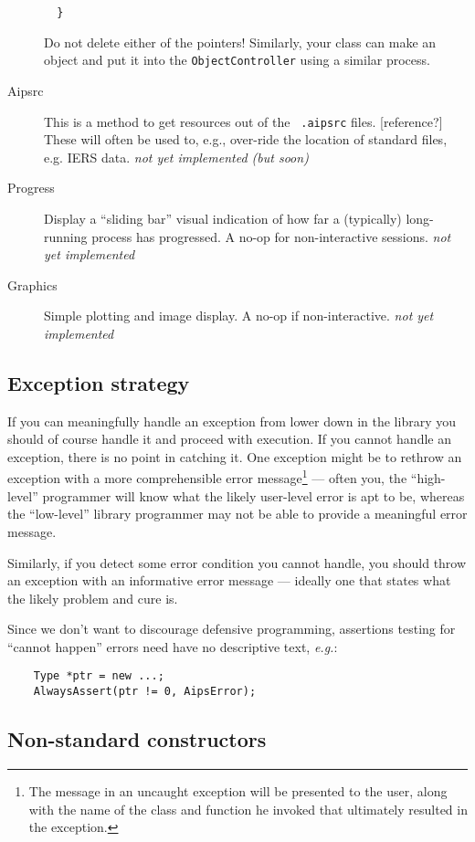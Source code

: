 \begin{description}
\begin{verbatim}
  }
  \end{verbatim}
  Do not delete either of the pointers! Similarly, your class can make
  an object and put it into the {\tt ObjectController} using a similar
  process.
  \item[Aipsrc] This is a method to get resources out of the {\tt
  .aipsrc} files. [reference?] These will often be used to, e.g.,
  over-ride the location of standard files, e.g. IERS data.  {\em not
  yet implemented (but soon)}
  \item[Progress] Display a ``sliding bar'' visual indication of how
  far a (typically) long-running process has progressed. A no-op for
  non-interactive sessions. {\em not yet implemented} 
  \item[Graphics] Simple plotting and image display. A no-op if
  non-interactive. {\em not yet implemented}
\end{description}

\subsection{Exception strategy}

If you can meaningfully handle an exception from lower down in the
library you should of course handle it and proceed with execution. If
you cannot handle an exception, there is no point in catching it. One
exception might be to rethrow an exception with a more comprehensible
error message\footnote{The message in an uncaught exception will be
presented to the user, along with the name of the class and function
he invoked that ultimately resulted in the exception.} --- often you,
the ``high-level'' programmer will know what the likely user-level
error is apt to be, whereas the ``low-level'' library programmer 
may not be able to provide a meaningful error message.

Similarly, if you detect some error condition you cannot handle, you
should throw an exception with an informative error message ---
ideally one that states what the likely problem and cure is.

Since we don't want to discourage defensive programming, assertions
testing for ``cannot happen'' errors need have no descriptive text,
{\em e.g.}:
\begin{verbatim}
    Type *ptr = new ...;
    AlwaysAssert(ptr != 0, AipsError);
\end{verbatim}

\subsection{Non-standard constructors}

